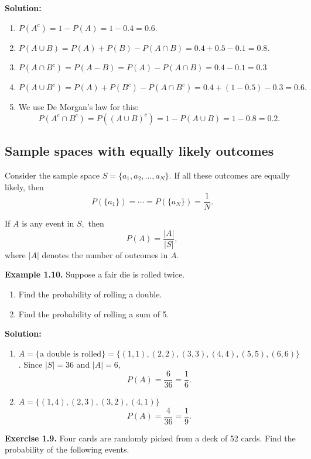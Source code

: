 \documentclass[
  12pt,
]{krantzNoCorner}
\providecommand{\tightlist}{%
  \setlength{\itemsep}{0pt}\setlength{\parskip}{0pt}}
\begin{document}
\textbf{Solution:}

\begin{enumerate}
\def\labelenumi{\arabic{enumi}.}
\tightlist
\item
  \(P(A^c)=1-P(A) = 1-0.4 = 0.6.\)
\item
  \(P(A\cup B)=P(A)+P(B)-P(A\cap B)=0.4+0.5-0.1 = 0.8.\)
\item
  \(P(A\cap B^c)=P(A-B)=P(A)-P(A\cap B)= 0.4-0.1=0.3\)
\item
  \(P(A\cup B^c)=P(A)+P(B^c)-P(A\cap B^c)=0.4+(1-0.5)-0.3 = 0.6.\)
\item
  We use De Morgan's law for this:
  \[P(A^c\cap B^c)=P((A\cup B)^c)=1-P(A\cup B )=1-0.8 = 0.2.\]
\end{enumerate}

\hypertarget{sample-spaces-with-equally-likely-outcomes}{%
\subsection{Sample spaces with equally likely outcomes}\label{sample-spaces-with-equally-likely-outcomes}}

Consider the sample space \(S=\{a_1,a_2,\dots,a_N\}.\) If all these
outcomes are equally likely, then
\[P(\{a_1\})=\cdots=P(\{a_N\})=\frac{1}{N}.\]

If \(A\) is any event in \(S,\) then \[P(A) = \frac{|A|}{|S|},\] where \(|A|\)
denotes the number of outcomes in \(A.\)

\textbf{Example 1.10.} Suppose a fair die is rolled twice.

\begin{enumerate}
\def\labelenumi{\arabic{enumi}.}
\tightlist
\item
  Find the probability of rolling a double.
\item
  Find the probability of rolling a sum of 5.
\end{enumerate}

\textbf{Solution:}

\begin{enumerate}
\def\labelenumi{\arabic{enumi}.}
\item
  \(A=\{\text{a double is rolled}\}=\{(1,1),(2,2),(3,3),(4,4),(5,5),(6,6)\}\).
  Since \(|S|=36\) and \(|A|=6,\) \[P(A)=\frac{6}{36}=\frac{1}{6}.\]
\item
  \(A=\{(1,4), (2,3),(3,2),(4,1)\}\) \[P(A)=\frac{4}{36}=\frac{1}{9}.\]
\end{enumerate}

\textbf{Exercise 1.9.} Four cards are randomly picked from a deck of 52
cards. Find the probability of the following events.
\end{document}
